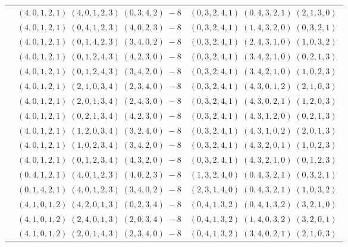 \documentclass[11pt]{article}
\begin{document}
\begin{longtable}[l]{|c|c|c|}
 \cline{2-3} 
 & $(4 ,0 ,1 ,2 ,1) \;(4 ,0 ,1 ,2 ,3) \;(0 ,3 ,4 ,2) \;-8$ & $(0 ,3 ,2 ,4 ,1) \;(0 ,4 ,3 ,2 ,1) \;(2 ,1 ,3 ,0) \;$\\ 
 \cline{2-3} 
 & $(4 ,0 ,1 ,2 ,1) \;(0 ,4 ,1 ,2 ,3) \;(4 ,0 ,2 ,3) \;-8$ & $(0 ,3 ,2 ,4 ,1) \;(1 ,4 ,3 ,2 ,0) \;(0 ,3 ,2 ,1) \;$\\ 
 \cline{2-3} 
 & $(4 ,0 ,1 ,2 ,1) \;(0 ,1 ,4 ,2 ,3) \;(3 ,4 ,0 ,2) \;-8$ & $(0 ,3 ,2 ,4 ,1) \;(2 ,4 ,3 ,1 ,0) \;(1 ,0 ,3 ,2) \;$\\ 
 \cline{2-3} 
 & $(4 ,0 ,1 ,2 ,1) \;(0 ,1 ,2 ,4 ,3) \;(4 ,2 ,3 ,0) \;-8$ & $(0 ,3 ,2 ,4 ,1) \;(3 ,4 ,2 ,1 ,0) \;(0 ,2 ,1 ,3) \;$\\ 
 \cline{2-3} 
 & $(4 ,0 ,1 ,2 ,1) \;(0 ,1 ,2 ,4 ,3) \;(3 ,4 ,2 ,0) \;-8$ & $(0 ,3 ,2 ,4 ,1) \;(3 ,4 ,2 ,1 ,0) \;(1 ,0 ,2 ,3) \;$\\ 
 \cline{2-3} 
 & $(4 ,0 ,1 ,2 ,1) \;(2 ,1 ,0 ,3 ,4) \;(2 ,3 ,4 ,0) \;-8$ & $(0 ,3 ,2 ,4 ,1) \;(4 ,3 ,0 ,1 ,2) \;(2 ,1 ,0 ,3) \;$\\ 
 \cline{2-3} 
 & $(4 ,0 ,1 ,2 ,1) \;(2 ,0 ,1 ,3 ,4) \;(2 ,4 ,3 ,0) \;-8$ & $(0 ,3 ,2 ,4 ,1) \;(4 ,3 ,0 ,2 ,1) \;(1 ,2 ,0 ,3) \;$\\ 
 \cline{2-3} 
 & $(4 ,0 ,1 ,2 ,1) \;(0 ,2 ,1 ,3 ,4) \;(4 ,2 ,3 ,0) \;-8$ & $(0 ,3 ,2 ,4 ,1) \;(4 ,3 ,1 ,2 ,0) \;(0 ,2 ,1 ,3) \;$\\ 
 \cline{2-3} 
 & $(4 ,0 ,1 ,2 ,1) \;(1 ,2 ,0 ,3 ,4) \;(3 ,2 ,4 ,0) \;-8$ & $(0 ,3 ,2 ,4 ,1) \;(4 ,3 ,1 ,0 ,2) \;(2 ,0 ,1 ,3) \;$\\ 
 \cline{2-3} 
 & $(4 ,0 ,1 ,2 ,1) \;(1 ,0 ,2 ,3 ,4) \;(3 ,4 ,2 ,0) \;-8$ & $(0 ,3 ,2 ,4 ,1) \;(4 ,3 ,2 ,0 ,1) \;(1 ,0 ,2 ,3) \;$\\ 
 \cline{2-3} 
 & $(4 ,0 ,1 ,2 ,1) \;(0 ,1 ,2 ,3 ,4) \;(4 ,3 ,2 ,0) \;-8$ & $(0 ,3 ,2 ,4 ,1) \;(4 ,3 ,2 ,1 ,0) \;(0 ,1 ,2 ,3) \;$\\ 
 \cline{2-3} 
 & $(0 ,4 ,1 ,2 ,1) \;(4 ,0 ,1 ,2 ,3) \;(4 ,0 ,2 ,3) \;-8$ & $(1 ,3 ,2 ,4 ,0) \;(0 ,4 ,3 ,2 ,1) \;(0 ,3 ,2 ,1) \;$\\ 
 \cline{2-3} 
 & $(0 ,1 ,4 ,2 ,1) \;(4 ,0 ,1 ,2 ,3) \;(3 ,4 ,0 ,2) \;-8$ & $(2 ,3 ,1 ,4 ,0) \;(0 ,4 ,3 ,2 ,1) \;(1 ,0 ,3 ,2) \;$\\ 
 \cline{2-3} 
 & $(4 ,1 ,0 ,1 ,2) \;(4 ,2 ,0 ,1 ,3) \;(0 ,2 ,3 ,4) \;-8$ & $(0 ,4 ,1 ,3 ,2) \;(0 ,4 ,1 ,3 ,2) \;(3 ,2 ,1 ,0) \;$\\ 
 \cline{2-3} 
 & $(4 ,1 ,0 ,1 ,2) \;(2 ,4 ,0 ,1 ,3) \;(2 ,0 ,3 ,4) \;-8$ & $(0 ,4 ,1 ,3 ,2) \;(1 ,4 ,0 ,3 ,2) \;(3 ,2 ,0 ,1) \;$\\ 
 \cline{2-3} 
 & $(4 ,1 ,0 ,1 ,2) \;(2 ,0 ,1 ,4 ,3) \;(2 ,3 ,4 ,0) \;-8$ & $(0 ,4 ,1 ,3 ,2) \;(3 ,4 ,0 ,2 ,1) \;(2 ,1 ,0 ,3) \;$\\ 

\end{longtable}
\end{document}
